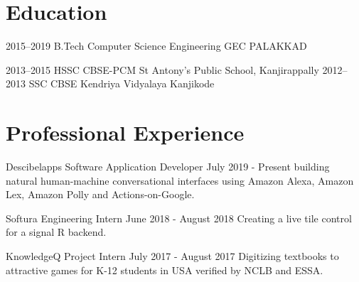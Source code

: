 \documentclass[]{cv-style}          %
\begin{document}

\section{Education}

\begin{entrylist}
\entry
{2015--2019}
{B.Tech {\normalfont Computer Science Engineering }}
{GEC PALAKKAD}
{\vspace{-0.3cm}}

\entry
{2013--2015}
{HSSC {\normalfont CBSE-PCM }}
{St Antony's Public School, Kanjirappally}
{\vspace{-0.3cm}}
\entry
{2012--2013}
{SSC {\normalfont CBSE }}
{Kendriya Vidyalaya Kanjikode}
{}
\end{entrylist}


\section{ Professional Experience}

\begin{entrylist}
\entry
{Descibelapps}
{Software Application Developer }
{July 2019 - Present}
{building natural human-machine conversational interfaces using Amazon Alexa, Amazon Lex, Amazon Polly and Actions-on-Google.}
{\vspace{-0.3cm}}
\end{entrylist}

\begin{entrylist}
\entry
{Softura}
{Engineering Intern}
{June 2018 - August 2018}
{Creating a live tile control for a signal R backend. }
{\vspace{-0.3cm}}
\end{entrylist}

\begin{entrylist}
\entry
{KnowledgeQ}
{Project Intern}
{July 2017 - August 2017}
{Digitizing textbooks to attractive games for K-12 students in USA verified by NCLB and ESSA.}
{\vspace{-0.3cm}}
\end{entrylist}
\end{document}
